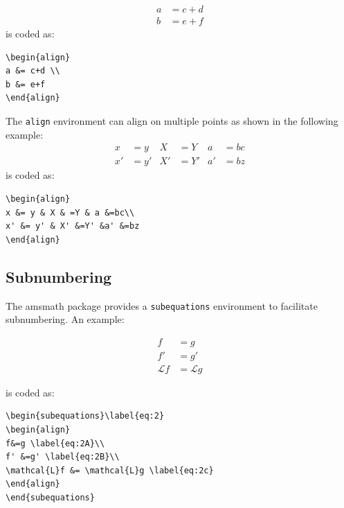 \documentclass[]{IEEEtran}
\begin{document}
\begin{align}
	a & = c+d \\
	b & = e+f
\end{align}
\noindent is coded as:
\begin{verbatim}
\begin{align}
a &= c+d \\
b &= e+f
\end{align}
\end{verbatim}

The {\tt{align}} environment can align on multiple  points as shown in the following example:
\begin{align}
	x  & = y  & X  & =Y  & a  & =bc \\
	x' & = y' & X' & =Y' & a' & =bz
\end{align}
\noindent is coded as:
\begin{verbatim}
\begin{align}
x &= y & X & =Y & a &=bc\\
x' &= y' & X' &=Y' &a' &=bz
\end{align}
\end{verbatim}





\subsection{Subnumbering}
The amsmath package provides a {\tt{subequations}} environment to facilitate subnumbering. An example:

\begin{subequations}\label{eq:2}
	\begin{align}
		f            & =g \label{eq:2A}             \\
		f'           & =g' \label{eq:2B}            \\
		\mathcal{L}f & = \mathcal{L}g \label{eq:2c}
	\end{align}
\end{subequations}

\noindent is coded as:
\begin{verbatim}
\begin{subequations}\label{eq:2}
\begin{align}
f&=g \label{eq:2A}\\
f' &=g' \label{eq:2B}\\
\mathcal{L}f &= \mathcal{L}g \label{eq:2c}
\end{align}
\end{subequations}

\end{verbatim}
\end{document}
